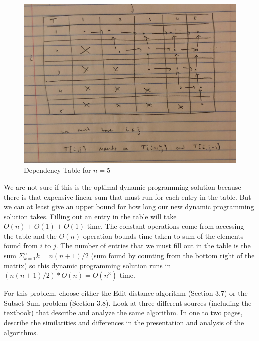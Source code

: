 \documentclass{article}
\begin{document}
\begin{enumerate}
\begin{figure}
\begin{center}
                \includegraphics[scale=0.1]{image0}
                \caption{Dependency Table for $n=5$}
    		    \label{fig:dynprog}
            \end{center}
        \end{figure}

        We are not sure if this is the optimal dynamic programming solution because there is that expensive linear sum that must run for each entry in the table.
        But we can at least give an upper bound for how long our new dynamic programming solution takes.
        Filling out an entry in the table will take $O (n) + O(1) + O(1)$ time.
        The constant operations come from accessing the table and the $O(n)$ operation bounds time taken to sum of the elements found from $i$ to $j$.
        The number of entries that we must fill out in the table is the sum $\Sigma _{k=1}^n k = n(n+1)/2$ (sum found by counting from the bottom right of the matrix) so this dynamic programming solution runs in $(n(n+1)/2) * O (n) = O(n^3)$ time.
\end{enumerate}


\nextprob
{}

For this problem, choose either the Edit distance algorithm (Section 3.7) or the
Subset Sum problem (Section 3.8). Look at three different sources (including the
textbook) that describe
and analyze the same algorithm. In one to two pages, describe the similarities
and differences in the presentation and analysis of the algorithms.
\end{document}
